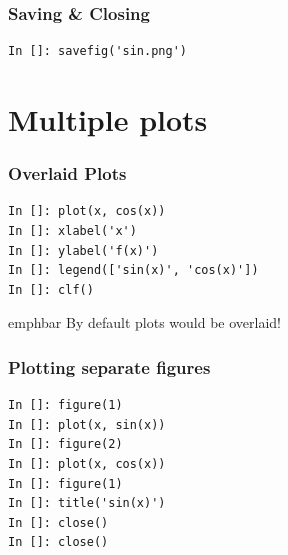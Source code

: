 \documentclass[14pt,compress]{beamer}
\newcommand{\emphbar}[1]
{\begin{beamercolorbox}[rounded=true]{emphbar} 
      {#1}
 \end{beamercolorbox}
}
\newcounter{time}
\newcommand{\inctime}[1]{\addtocounter{time}{#1}{\tiny \thetime\ m}}
\begin{document}

\begin{frame}[fragile]
\frametitle{Saving \& Closing}
\begin{lstlisting}
In []: savefig('sin.png')

\end{lstlisting}
\end{frame}






\section{Multiple plots}
\begin{frame}[fragile]
\frametitle{Overlaid Plots}
\begin{lstlisting}
In []: plot(x, cos(x))
In []: xlabel('x')
In []: ylabel('f(x)')
In []: legend(['sin(x)', 'cos(x)']) 
In []: clf()
\end{lstlisting}
\emphbar{By default plots would be overlaid!}
\end{frame}

\begin{frame}[fragile]
\frametitle{Plotting separate figures}
\begin{lstlisting}
In []: figure(1)
In []: plot(x, sin(x))
In []: figure(2)
In []: plot(x, cos(x))
In []: figure(1)
In []: title('sin(x)')
In []: close()
In []: close()
\end{lstlisting}
\end{frame}
\end{document}
